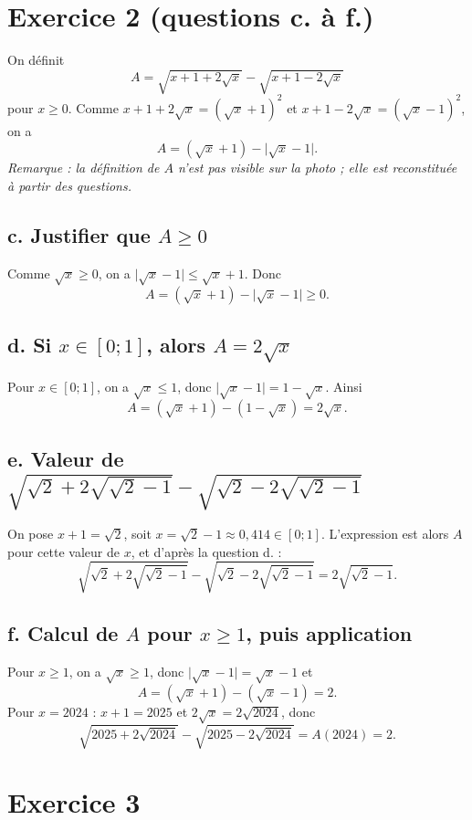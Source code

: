 \documentclass[11pt,a4paper]{article}
\begin{document}
\section*{Exercice 2 (questions c. à f.)}

On d\'efinit
\[
A=\sqrt{x+1+2\sqrt x}-\sqrt{x+1-2\sqrt x}
\]
pour $x\ge0$. Comme $x+1+2\sqrt x=(\sqrt x+1)^2$ et $x+1-2\sqrt x=(\sqrt x-1)^2$, on a
\[
A=(\sqrt x+1)-\lvert\sqrt x-1\rvert.
\]
\emph{Remarque : la d\'efinition de $A$ n'est pas visible sur la photo ; elle est reconstitu\'ee \`a partir des questions.}

\subsection*{c. Justifier que $A\ge0$}
Comme $\sqrt x\ge0$, on a $\lvert\sqrt x-1\rvert\le\sqrt x+1$. Donc
\[
A=(\sqrt x+1)-\lvert\sqrt x-1\rvert\ge0.
\]

\subsection*{d. Si $x\in[0;1]$, alors $A=2\sqrt x$}
Pour $x\in[0;1]$, on a $\sqrt x\le1$, donc $\lvert\sqrt x-1\rvert=1-\sqrt x$. Ainsi
\[
A=(\sqrt x+1)-(1-\sqrt x)=2\sqrt x.
\]

\subsection*{e. Valeur de $\sqrt{\sqrt2+2\sqrt{\sqrt2-1}}-\sqrt{\sqrt2-2\sqrt{\sqrt2-1}}$}
On pose $x+1=\sqrt2$, soit $x=\sqrt2-1\approx0{,}414\in[0;1]$. L'expression est alors $A$ pour cette valeur de $x$, et d'apr\`es la question d. :
\[
\sqrt{\sqrt2+2\sqrt{\sqrt2-1}}-\sqrt{\sqrt2-2\sqrt{\sqrt2-1}}=2\sqrt{\sqrt2-1}.
\]

\subsection*{f. Calcul de $A$ pour $x\ge1$, puis application}
Pour $x\ge1$, on a $\sqrt x\ge1$, donc $\lvert\sqrt x-1\rvert=\sqrt x-1$ et
\[
A=(\sqrt x+1)-(\sqrt x-1)=2.
\]
Pour $x=2024$ : $x+1=2025$ et $2\sqrt x=2\sqrt{2024}$, donc
\[
\sqrt{2025+2\sqrt{2024}}-\sqrt{2025-2\sqrt{2024}}=A(2024)=2.
\]

\section*{Exercice 3}
\end{document}
